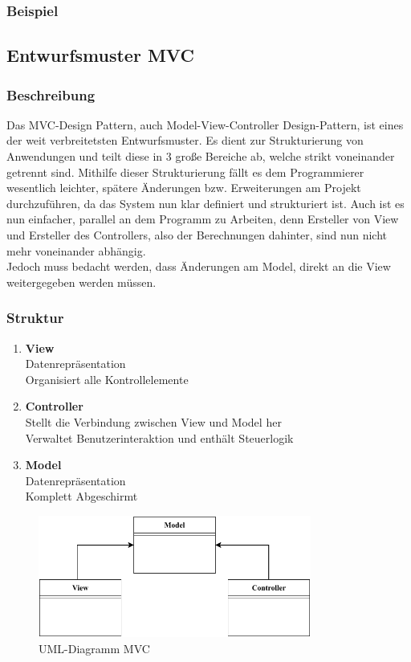 \subsubsection{Beispiel}
\subsection{Entwurfsmuster MVC}\label{subsec:entwurfsmuster-mvc}
\subsubsection{Beschreibung}
Das MVC-Design Pattern, auch Model-View-Controller Design-Pattern, ist eines der weit verbreitetsten Entwurfsmuster.
Es dient zur Strukturierung von Anwendungen und teilt diese in 3 große Bereiche ab, welche strikt voneinander getrennt sind.
Mithilfe dieser Strukturierung fällt es dem Programmierer wesentlich leichter, spätere Änderungen bzw. Erweiterungen am Projekt durchzuführen, da das System nun klar definiert und strukturiert ist.
Auch ist es nun einfacher, parallel an dem Programm zu Arbeiten, denn Ersteller von View und Ersteller des Controllers, also der Berechnungen dahinter, sind nun nicht mehr voneinander abhängig.\\
Jedoch muss bedacht werden, dass Änderungen am Model, direkt an die View weitergegeben werden müssen.
\subsubsection{Struktur}

\begin{enumerate}
    \item \textbf{View}  \\
    Datenrepräsentation\\
    Organisiert alle Kontrollelemente
    \item \textbf{Controller} \\
    Stellt die Verbindung zwischen View und Model her\\
    Verwaltet Benutzerinteraktion und enthält Steuerlogik
    \item \textbf{Model} \\
    Datenrepräsentation\\
    Komplett Abgeschirmt
\end{enumerate}
\begin{figure}[H]
    \centering
    \includegraphics[width=0.8\textwidth]{fig/ainf/ModelViewController.pdf}
    \caption{UML-Diagramm MVC}
    \label{fig:UML-Diagramm MVC}
\end{figure}
